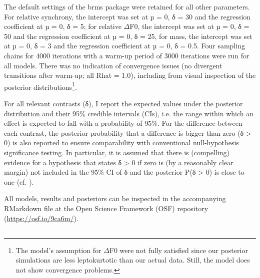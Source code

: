 The default settings of the brms package were retained for all other parameters. For relative synchrony, the intercept was set at µ = 0, δ = 30 and the regression coefficient at µ = 0, δ = 5; for relative ${\Delta}$F0, the intercept was set at µ = 0, δ = 50 and the regression coefficient at µ = 0, δ = 25, for mass, the intercept was set at µ = 0, δ = 3 and the regression coefficient at µ = 0, δ = 0.5. Four sampling chains for 4000 iterations with a warm-up period of 3000 iterations were run for all models. There was no indication of convergence issues (no divergent transitions after warm-up; all Rhat = 1.0), including from visual inspection of the posterior distributions\footnote{The model’s assumption for \textrm{${\Delta}$}F0 were not fully satisfied since our posterior simulations are less leptokurtotic than our actual data. Still, the model does not show convergence problems.}.

For all relevant contrasts (δ), I report the expected values under the posterior distribution and their 95\% credible intervals (CIs), i.e. the range within which an effect is expected to fall with a probability of 95\%. For the difference between each contrast, the posterior probability that a difference is bigger than zero (δ > 0) is also reported to ensure comparability with conventional null-hypothesis significance testing. In particular, it is assumed that there is (compelling) evidence for a hypothesis that states δ > 0 if zero is (by a reasonably clear margin) not included in the 95\% CI of δ and the posterior P(δ > 0) is close to one (cf. \citealt{FrankeRoettger2019}). 

All models, results and posteriors can be inspected in the accompanying RMarkdown file at the Open Science Framework (OSF) repository (\url{https://osf.io/9ca6m/}).

\subsection{}
